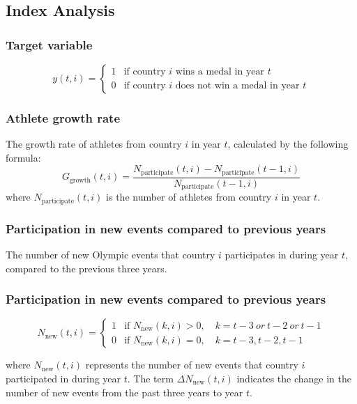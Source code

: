 \documentclass{mcmthesis}
\begin{document}
\subsection{Index Analysis}


\subsubsection{Target variable}
	\[
	y(t,i) = 
	\begin{cases} 
		1 & \text{if country } i \text{ wins a medal in year } t \\ 
		0 & \text{if country } i \text{ does not win a medal in year } t 
	\end{cases}
	\]
\subsubsection{Athlete growth rate}
        The growth rate of athletes from country $i$ in year $t$, calculated by the following formula:
		\[
		G_{\text{growth}}(t,i) = \frac{N_{\text{participate}}(t,i) - N_{\text{participate}}(t-1,i)}{N_{\text{participate}}(t-1,i)}
		\]
		where $N_{\text{participate}}(t,i)$ is the number of athletes from country $i$ in year $t$.
		
\subsubsection{Participation in new events compared to previous years} 
The number of new Olympic events that country $i$ participates in during year $t$, compared to the previous three years. 
\subsubsection{Participation in new events compared to previous years} 
\[
N_{\text{new}}(t,i) =
\begin{cases}
	1 & \text{if } N_{\text{new}}(k,i) > 0, \quad k = t-3\ or\ t-2\ or\ t-1 \\
	0 & \text{if } N_{\text{new}}(k,i) = 0, \quad k = t-3, t-2, t-1
\end{cases}
\]

where $N_{\text{new}}(t,i)$ represents the number of new events that country $i$ participated in during year $t$. The term $\Delta N_{\text{new}}(t,i)$ indicates the change in the number of new events from the past three years to year $t$.
	
	
	
	
	
\end{document}
